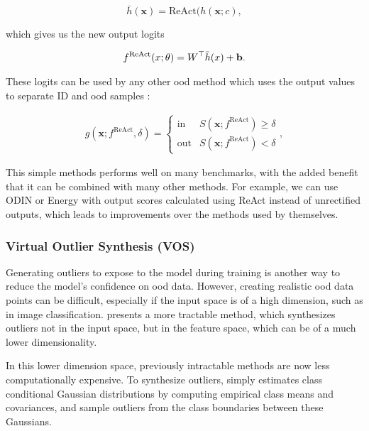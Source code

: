 \documentclass[UKenglish]{uiomasterthesis} %
\theoremstyle{definition}
\begin{document}
\begin{equation}\label{dog}
  \bar{h}(\bm{x}) = \text{ReAct}(h(\bm{x}; c),
\end{equation}

which gives us the new output logits 

\begin{align}
f^{\text{ReAct}}(\*x;\theta) = \*W^\top \bar h(\*x) + \mathbf{b}.
\end{align}

These logits can be used by any other \ac{ood} method which uses the output values to separate ID and \ac{ood} samples \cite{react}:

\begin{align}
\label{eq:threshold}
    g(\bm{x}; f^\text{ReAct}, \delta)=\begin{cases} 
        \text{in } & S(\bm{x};f^\text{ReAct})\ge \delta \\
        \text{out} & S(\bm{x};f^\text{ReAct}) < \delta 
   \end{cases},
\end{align}

This simple methods performs well on many benchmarks, with the added benefit that it can be combined with many other methods. For example, we can use ODIN or Energy with output scores calculated using ReAct instead of unrectified outputs, which leads to improvements over the methods used by themselves.
\\

\subsubsection{Virtual Outlier Synthesis (VOS)}

Generating outliers to expose to the model during training is another way to reduce the model's confidence on \ac{ood} data. However, creating realistic \ac{ood} data points can be difficult, especially if the input space is of a high dimension, such as in image classification. \cite{vos} presents a more tractable method, which synthesizes outliers not in the input space, but in the feature space, which can be of a much lower dimensionality.

In this lower dimension space, previously intractable methods are now less computationally expensive. To synthesize outliers, \cite{vos} simply estimates class conditional Gaussian distributions by computing empirical class means and covariances, and sample outliers from the class boundaries between these Gaussians.
\end{document}
